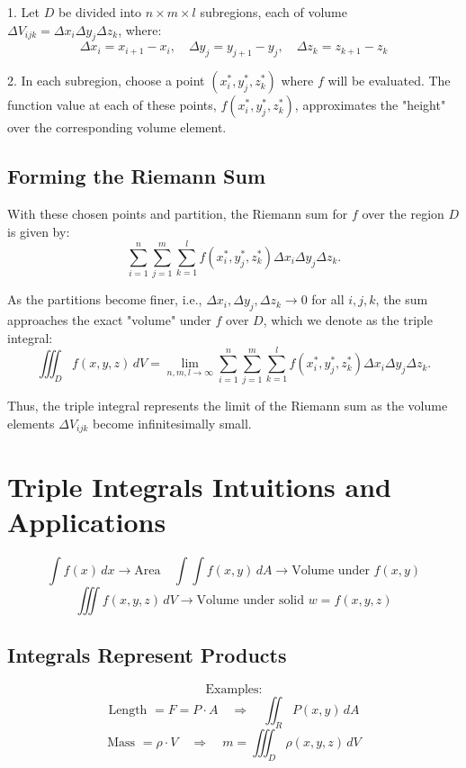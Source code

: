 \documentclass{report}
\begin{document}
1. Let \( D \) be divided into \( n \times m \times l \) subregions, each of volume \( \Delta V_{ijk} = \Delta x_i \Delta y_j \Delta z_k \), where:
\[
	\Delta x_i = x_{i+1} - x_i, \quad \Delta y_j = y_{j+1} - y_j, \quad \Delta z_k = z_{k+1} - z_k
\]

2. In each subregion, choose a point \( (x_i^*, y_j^*, z_k^*) \) where \( f \) will be evaluated. The function value at each of these points, \( f(x_i^*, y_j^*, z_k^*) \), approximates the "height" over the corresponding volume element.

\subsection{Forming the Riemann Sum}

With these chosen points and partition, the Riemann sum for \( f \) over the region \( D \) is given by:
\[
	\sum_{i=1}^n \sum_{j=1}^m \sum_{k=1}^l f(x_i^*, y_j^*, z_k^*) \Delta x_i \Delta y_j \Delta z_k.
\]

As the partitions become finer, i.e., \( \Delta x_i, \Delta y_j, \Delta z_k \to 0 \) for all \( i, j, k \), the sum approaches the exact "volume" under \( f \) over \( D \), which we denote as the triple integral:
\[
	\iiint_D f(x, y, z) \, dV = \lim_{n, m, l \to \infty} \sum_{i=1}^n \sum_{j=1}^m \sum_{k=1}^l f(x_i^*, y_j^*, z_k^*) \Delta x_i \Delta y_j \Delta z_k.
\]

Thus, the triple integral represents the limit of the Riemann sum as the volume elements \( \Delta V_{ijk} \) become infinitesimally small.

\section{Triple Integrals Intuitions and Applications}

\[
	\int f(x) \, dx \rightarrow \text{Area} \quad \int\int f(x,y) \, dA \rightarrow \text{Volume under } f(x,y)
\]
\[
	\iiint f(x,y,z) \, dV \rightarrow \text{Volume under solid } w = f(x,y,z)
\]

\subsection{Integrals Represent Products}
\[
	\text{Examples:}
\]
\[
	\text{Length } = F = P \cdot A \quad \Rightarrow \quad \iint_R P(x,y) \, dA
\]
\[
	\text{Mass } = \rho \cdot V \quad \Rightarrow \quad m = \iiint_D \rho(x,y,z) \, dV
\]

\end{document}
